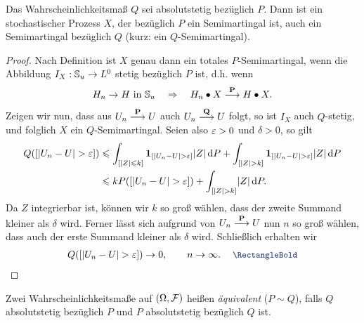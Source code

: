 \begin{theorem}
\label{prop:3.7}
Das Wahrscheinlichkeitsmaß $Q$ sei absolutstetig bezüglich
  $P$. Dann ist ein stochastischer Prozess $X$, der bezüglich $P$ ein
  Semimartingal ist, auch ein Semimartingal bezüglich $Q$ (kurz: ein
  $Q$-Semimartingal).\fish
\end{theorem}
\begin{proof}
Nach Definition ist $X$ genau dann ein totales $P$-Semimartingal, wenn die
Abbildung $I_X : \S_u \to L^0$ stetig bezüglich $P$ ist, d.h. wenn 
\begin{align*}
H_n\to H\text{ in }\S_u \quad \Rightarrow\quad H_n\bullet
X\Pto H\bullet X.
\end{align*}
Zeigen wir nun, dass aus $U_n\Pto U$ auch $U_n\overset{\mathbf Q}{\longto} U$
folgt, so ist $I_X$ auch $Q$-stetig, und folglich $X$ ein
$Q$-Semimartingal. Seien also $\ep > 0$ und $\delta > 0$, so gilt
\begin{align*}
Q([\abs{U_n-U}> \ep]) 
&\le \int_{[\abs{Z}\le k]}\Id_{[\abs{U_n-U}> \ep]}\abs{Z}\,\dP
+
\int_{[\abs{Z}> k]}\Id_{[\abs{U_n-U}> \ep]}\abs{Z}\,\dP\\
&\le k P([\abs{U_n-U}> \ep]) +
\int_{[\abs{Z}> k]}\abs{Z}\,\dP.
\end{align*}
Da $Z$ integrierbar ist, können wir $k$ so groß wählen, dass der zweite Summand
kleiner als $\delta$ wird. Ferner lässt sich aufgrund von $U_n\Pto U$ nun $n$ so
groß wählen, dass auch der erste Summand kleiner als $\delta$ wird. Schließlich
erhalten wir
\begin{align*}
Q([\abs{U_n-U}> \ep])  \to 0,\qquad n\to \infty.\qed
\end{align*} 
\end{proof}

\begin{definition}
\label{defn:3.4}
 Zwei Wahrscheinlichkeitsmaße auf $(\Omega,\FF)$ heißen
  \emph{äquivalent} ($P \sim Q$), falls $Q$ absolutstetig bezüglich $P$  und
  $P$ absolutstetig bezüglich $Q$ ist.\fish
\end{definition}

